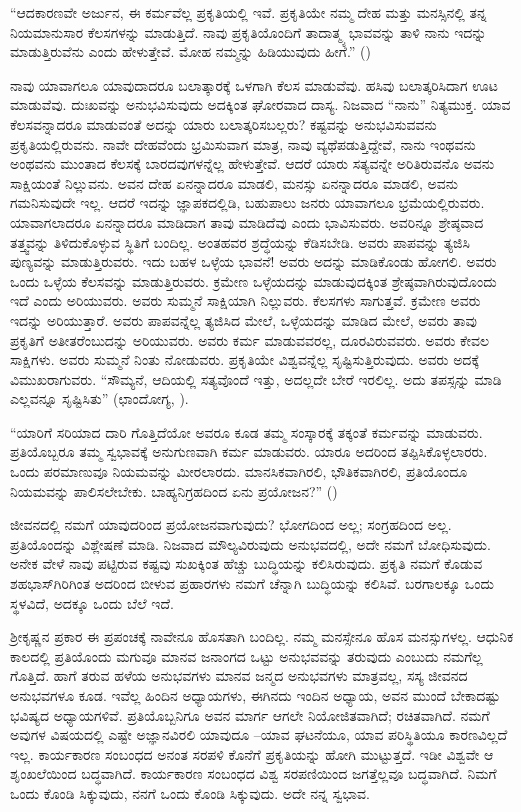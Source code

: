 “ಆದಕಾರಣವೇ ಅರ್ಜುನ, ಈ ಕರ್ಮವೆಲ್ಲ ಪ್ರಕೃತಿಯಲ್ಲಿ ಇವೆ. ಪ್ರಕೃತಿಯೇ ನಮ್ಮ ದೇಹ ಮತ್ತು ಮನಸ್ಸಿನಲ್ಲಿ ತನ್ನ ನಿಯಮಾನುಸಾರ ಕೆಲಸಗಳನ್ನು ಮಾಡುತ್ತಿದೆ. ನಾವು ಪ್ರಕೃತಿಯೊಂದಿಗೆ ತಾದಾತ್ಮ್ಯ ಭಾವವನ್ನು ತಾಳಿ ನಾನು ಇದನ್ನು ಮಾಡುತ್ತಿರುವೆನು ಎಂದು ಹೇಳುತ್ತೇವೆ. ಮೋಹ ನಮ್ಮನ್ನು ಹಿಡಿಯುವುದು ಹೀಗೆ.” ()

ನಾವು ಯಾವಾಗಲೂ ಯಾವುದಾದರೂ ಬಲಾತ್ಕಾರಕ್ಕೆ ಒಳಗಾಗಿ ಕೆಲಸ ಮಾಡುವೆವು. ಹಸಿವು ಬಲಾತ್ಕರಿಸಿದಾಗ ಊಟ ಮಾಡುವೆವು. ದುಃಖವನ್ನು ಅನುಭವಿಸುವುದು ಅದಕ್ಕಿಂತ ಘೋರವಾದ ದಾಸ್ಯ. ನಿಜವಾದ “ನಾನು” ನಿತ್ಯಮುಕ್ತ. ಯಾವ ಕೆಲಸವನ್ನಾದರೂ ಮಾಡುವಂತೆ ಅದನ್ನು ಯಾರು ಬಲಾತ್ಕರಿಸಬಲ್ಲರು? ಕಷ್ಟವನ್ನು ಅನುಭವಿಸುವವನು ಪ್ರಕೃತಿಯಲ್ಲಿರುವನು. ನಾವೇ ದೇಹವೆಂದು ಭ್ರಮಿಸುವಾಗ ಮಾತ್ರ, ನಾವು ವ್ಯಥೆಪಡುತ್ತಿದ್ದೇವೆ, ನಾನು ಇಂಥವನು ಅಂಥವನು ಮುಂತಾದ ಕೆಲಸಕ್ಕೆ ಬಾರದವುಗಳನ್ನೆಲ್ಲ ಹೇಳುತ್ತೇವೆ. ಆದರೆ ಯಾರು ಸತ್ಯವನ್ನೇ ಅರಿತಿರುವನೊ ಅವನು ಸಾಕ್ಷಿಯಂತೆ ನಿಲ್ಲುವನು. ಅವನ ದೇಹ ಏನನ್ನಾದರೂ ಮಾಡಲಿ, ಮನಸ್ಸು ಏನನ್ನಾದರೂ ಮಾಡಲಿ, ಅವನು ಗಮನಿಸುವುದೇ ಇಲ್ಲ. ಆದರೆ ಇದನ್ನು ಜ್ಞಾಪಕದಲ್ಲಿಡಿ, ಬಹುಪಾಲು ಜನರು ಯಾವಾಗಲೂ ಭ್ರಮೆಯಲ್ಲಿರುವರು. ಯಾವಾಗಲಾದರೂ ಏನನ್ನಾದರೂ ಮಾಡಿದಾಗ ತಾವು ಮಾಡಿದೆವು ಎಂದು ಭಾವಿಸುವರು. ಅವರಿನ್ನೂ ಶ್ರೇಷ್ಠವಾದ ತತ್ತ್ವವನ್ನು ತಿಳಿದುಕೊಳ್ಳುವ ಸ್ಥಿತಿಗೆ ಬಂದಿಲ್ಲ. ಅಂತಹವರ ಶ್ರದ್ಧೆಯನ್ನು ಕೆಡಿಸಬೇಡಿ. ಅವರು ಪಾಪವನ್ನು ತ್ಯಜಿಸಿ ಪುಣ್ಯವನ್ನು ಮಾಡುತ್ತಿರುವರು. ಇದು ಬಹಳ ಒಳ್ಳೆಯ ಭಾವನೆ! ಅವರು ಅದನ್ನು ಮಾಡಿಕೊಂಡು ಹೋಗಲಿ. ಅವರು ಒಂದು ಒಳ್ಳೆಯ ಕೆಲಸವನ್ನು ಮಾಡುತ್ತಿರುವರು. ಕ್ರಮೇಣ ಒಳ್ಳೆಯದನ್ನು ಮಾಡುವುದಕ್ಕಿಂತ ಶ್ರೇಷ್ಠವಾಗಿರುವುದೊಂದು ಇದೆ ಎಂದು ಅರಿಯುವರು. ಅವರು ಸುಮ್ಮನೆ ಸಾಕ್ಷಿಯಾಗಿ ನಿಲ್ಲುವರು. ಕೆಲಸಗಳು ಸಾಗುತ್ತವೆ. ಕ್ರಮೇಣ ಅವರು ಇದನ್ನು ಅರಿಯುತ್ತಾರೆ. ಅವರು ಪಾಪವನ್ನೆಲ್ಲ ತ್ಯಜಿಸಿದ ಮೇಲೆ, ಒಳ್ಳೆಯದನ್ನು ಮಾಡಿದ ಮೇಲೆ, ಅವರು ತಾವು ಪ್ರಕೃತಿಗೆ ಅತೀತರೆಂಬುದನ್ನು ಅರಿಯುವರು. ಅವರು ಕರ್ಮ ಮಾಡುವವರಲ್ಲ, ದೂರವಿರುವವರು. ಅವರು ಕೇವಲ ಸಾಕ್ಷಿಗಳು. ಅವರು ಸುಮ್ಮನೆ ನಿಂತು ನೋಡುವರು. ಪ್ರಕೃತಿಯೇ ವಿಶ್ವವನ್ನೆಲ್ಲ ಸೃಷ್ಟಿಸುತ್ತಿರುವುದು. ಅವರು ಅದಕ್ಕೆ ವಿಮುಖರಾಗುವರು. “ಸೌಮ್ಯನೆ, ಆದಿಯಲ್ಲಿ ಸತ್ಯವೊಂದೆ ಇತ್ತು, ಅದಲ್ಲದೇ ಬೇರೆ ಇರಲಿಲ್ಲ. ಅದು ತಪಸ್ಸನ್ನು ಮಾಡಿ ಎಲ್ಲವನ್ನೂ ಸೃಷ್ಟಿಸಿತು” (ಛಾಂದೋಗ್ಯ, ).

“ಯಾರಿಗೆ ಸರಿಯಾದ ದಾರಿ ಗೊತ್ತಿದೆಯೋ ಅವರೂ ಕೂಡ ತಮ್ಮ ಸಂಸ್ಕಾರಕ್ಕೆ ತಕ್ಕಂತೆ ಕರ್ಮವನ್ನು ಮಾಡುವರು. ಪ್ರತಿಯೊಬ್ಬರೂ ತಮ್ಮ ಸ್ವಭಾವಕ್ಕೆ ಅನುಗುಣವಾಗಿ ಕರ್ಮ ಮಾಡುವರು. ಯಾರೂ ಅದರಿಂದ ತಪ್ಪಿಸಿಕೊಳ್ಳಲಾರರು. ಒಂದು ಪರಮಾಣುವೂ ನಿಯಮವನ್ನು ಮೀರಲಾರದು. ಮಾನಸಿಕವಾಗಿರಲಿ, ಭೌತಿಕವಾಗಿರಲಿ, ಪ್ರತಿಯೊಂದೂ ನಿಯಮವನ್ನು ಪಾಲಿಸಲೇಬೇಕು. ಬಾಹ್ಯನಿಗ್ರಹದಿಂದ ಏನು ಪ್ರಯೋಜನ?” ()

ಜೀವನದಲ್ಲಿ ನಮಗೆ ಯಾವುದರಿಂದ ಪ್ರಯೋಜನವಾಗುವುದು? ಭೋಗದಿಂದ ಅಲ್ಲ; ಸಂಗ್ರಹದಿಂದ ಅಲ್ಲ. ಪ್ರತಿಯೊಂದನ್ನು ವಿಶ್ಲೇಷಣೆ ಮಾಡಿ. ನಿಜವಾದ ಮೌಲ್ಯವಿರುವುದು ಅನುಭವದಲ್ಲಿ, ಅದೇ ನಮಗೆ ಬೋಧಿಸುವುದು. ಅನೇಕ ವೇಳೆ ನಾವು ಪಟ್ಟಿರುವ ಕಷ್ಟವು ಸುಖಕ್ಕಿಂತ ಹೆಚ್ಚು ಬುದ್ಧಿಯನ್ನು ಕಲಿಸಿರುವುದು. ಪ್ರಕೃತಿ ನಮಗೆ ಕೊಡುವ ಶಹಭಾಸ್​ಗಿರಿಗಿಂತ ಅದರಿಂದ ಬೀಳುವ ಪ್ರಹಾರಗಳು ನಮಗೆ ಚೆನ್ನಾಗಿ ಬುದ್ಧಿಯನ್ನು ಕಲಿಸಿವೆ. ಬರಗಾಲಕ್ಕೂ ಒಂದು ಸ್ಥಳವಿದೆ, ಅದಕ್ಕೂ ಒಂದು ಬೆಲೆ ಇದೆ.

ಶ‍್ರೀಕೃಷ್ಣನ ಪ್ರಕಾರ ಈ ಪ್ರಪಂಚಕ್ಕೆ ನಾವೇನೂ ಹೊಸತಾಗಿ ಬಂದಿಲ್ಲ. ನಮ್ಮ ಮನಸ್ಸೇನೂ ಹೊಸ ಮನಸ್ಸುಗಳಲ್ಲ. ಆಧುನಿಕ ಕಾಲದಲ್ಲಿ ಪ್ರತಿಯೊಂದು ಮಗುವೂ ಮಾನವ ಜನಾಂಗದ ಒಟ್ಟು ಅನುಭವವನ್ನು ತರುವುದು ಎಂಬುದು ನಮಗೆಲ್ಲ ಗೊತ್ತಿದೆ. ಹಾಗೆ ತರುವ ಹಳೆಯ ಅನುಭವಗಳು ಮಾನವ ಜನ್ಮದ ಅನುಭವಗಳು ಮಾತ್ರವಲ್ಲ, ಸಸ್ಯ ಜೀವನದ ಅನುಭವಗಳೂ ಕೂಡ. ಇವೆಲ್ಲ ಹಿಂದಿನ ಅಧ್ಯಾಯಗಳು, ಈಗಿನದು ಇಂದಿನ ಅಧ್ಯಾಯ, ಅವನ ಮುಂದೆ ಬೇಕಾದಷ್ಟು ಭವಿಷ್ಯದ ಅಧ್ಯಾಯಗಳಿವೆ. ಪ್ರತಿಯೊಬ್ಬನಿಗೂ ಅವನ ಮಾರ್ಗ ಆಗಲೇ ನಿಯೋಜಿತವಾಗಿದೆ; ರಚಿತವಾಗಿದೆ. ನಮಗೆ ಅವುಗಳ ವಿಷಯದಲ್ಲಿ ಎಷ್ಟೇ ಅಜ್ಞಾನವಿರಲಿ ಯಾವುದೂ –ಯಾವ ಘಟನೆಯೂ, ಯಾವ ಪರಿಸ್ಥಿತಿಯೂ ಕಾರಣವಿಲ್ಲದೆ ಇಲ್ಲ. ಕಾರ್ಯಕಾರಣ ಸಂಬಂಧದ ಅನಂತ ಸರಪಳಿ ಕೊನೆಗೆ ಪ್ರಕೃತಿಯನ್ನು ಹೋಗಿ ಮುಟ್ಟುತ್ತದೆ. ಇಡೀ ವಿಶ್ವವೇ ಆ ಶೃಂಖಲೆಯಿಂದ ಬದ್ಧವಾಗಿದೆ. ಕಾರ್ಯಕಾರಣ ಸಂಬಂಧದ ವಿಶ್ವ ಸರಪಣಿಯಿಂದ ಜಗತ್ತೆಲ್ಲವೂ ಬದ್ಧವಾಗಿದೆ. ನಿಮಗೆ ಒಂದು ಕೊಂಡಿ ಸಿಕ್ಕುವುದು, ನನಗೆ ಒಂದು ಕೊಂಡಿ ಸಿಕ್ಕುವುದು. ಅದೇ ನನ್ನ ಸ್ವಭಾವ.

